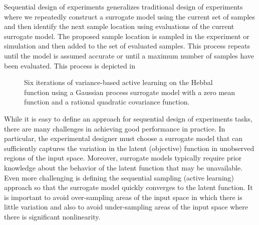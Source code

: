 \documentclass[conference]{IEEEtran}
\begin{document}
	Sequential design of experiments generalizes traditional design of experiments where we repeatedly construct a surrogate model using the current set of samples and then identify the next sample location using evaluations of the current surrogate model. The proposed sample location is sampled in the experiment or simulation and then added to the set of evaluated samples. This process repeats until the model is assumed accurate or until a maximum number of samples have been evaluated. This process is depicted in 
	
	\begin{figure}[htbp]
	    \centering
	     \hspace*{-1.5em}
	    
	     \hspace*{-1.5em}
	    
	     \hspace*{-1.5em}
	    
	    \caption{Six iterations of variance-based active learning on the Hebbal function \cite{hebbal2019bayesian} using a Gaussian process surrogate model with a zero mean function and a rational quadratic covariance function.}
	    \label{fig:sdoe_diagram}
	    \vspace*{-1em}
	\end{figure}
	
	While it is easy to define an approach for sequential design of experiments tasks, there are many challenges in achieving good performance in practice. In particular, the experimental designer must choose a surrogate model that can sufficiently captures the variation in the latent (objective) function in unobserved regions of the input space. Moreover, surrogate models typically require prior knowledge about the behavior of the latent function that may be unavailable. Even more challenging is defining the sequential sampling (active learning) approach so that the surrogate model quickly converges to the latent function. It is important to avoid over-sampling areas of the input space in which there is little variation and also to avoid under-sampling areas of the input space where there is significant nonlinearity.
	
\end{document}
